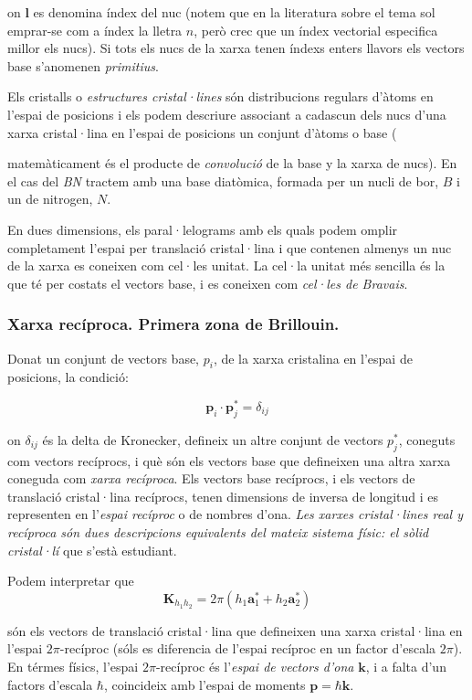 \documentclass[12pt]{article} %
\let\vec\mathbf %
\begin{document}
on $\vec l$ es denomina índex del nuc (notem que en la literatura sobre el tema sol emprar-se com a índex la lletra $n$, però crec que un índex vectorial especifica millor els nucs). Si tots els nucs de la xarxa tenen índexs enters llavors els vectors base s'anomenen \emph{primitius}.

Els cristalls o \emph{estructures cristal·lines} són distribucions regulars d'àtoms en l'espai de posicions i els podem descriure associant a cadascun dels nucs d'una xarxa cristal·lina en l'espai de posicions un conjunt d'àtoms o base ({matemàticament és el producte de \emph{convolució} de la base y la xarxa de nucs). En el cas del \emph{BN} tractem amb una base diatòmica, formada per un nucli de bor, $B$ i un de nitrogen, $N$. 

En dues dimensions, els paral·lelograms amb els quals podem omplir completament l'espai per translació cristal·lina i que contenen almenys un nuc de la xarxa es coneixen com cel·les unitat. La cel·la unitat més sencilla és la que té per costats el vectors base, i es coneixen com \emph{cel·les de Bravais}.

\subsubsection{Xarxa recíproca. Primera zona de Brillouin.}
Donat un conjunt de vectors base, $p_i$, de la xarxa cristalina en l'espai de posicions, la condició:

\begin{equation}
\label{eq:rec1}
\vec p_i\cdot\vec p_j^{*}=\delta_{ij}
\end{equation}

on $\delta_{ij}$ és la delta de Kronecker, defineix un altre conjunt de vectors $p_j^*$, coneguts com vectors recíprocs, i què són els vectors base que defineixen una altra xarxa coneguda com \textit{xarxa recíproca}. Els  vectors base recíprocs, i els vectors de translació cristal·lina recíprocs, tenen dimensions de inversa de longitud i es representen en l'\textit{espai recíproc} o de nombres d'ona. \textit{Les xarxes cristal·lines real y recíproca són dues descripcions equivalents del mateix sistema físic: el sòlid cristal·lí} que s'està estudiant.

Podem interpretar que
\begin{equation}
\label{eq:rec3}
\vec K_{h_1h_2}=2\pi\left(h_1\vec a_1^{*}+h_2\vec a_2^{*}\right)
\end{equation}

són els vectors de translació cristal·lina que defineixen una xarxa cristal·lina en l'espai $2\pi$-recíproc (sóls es diferencia de l'espai recíproc en un factor d'escala $2\pi$). En térmes físics, l'espai $2\pi$-recíproc és l'\emph{espai de vectors d'ona} $\vec k$, i a falta d'un factors d'escala $\hbar$, coincideix amb l'espai de moments  $\vec p=\hbar\vec k$.

}
\end{document}
